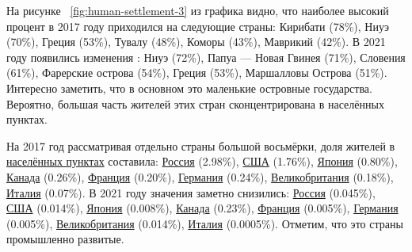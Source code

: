 \begin{figure*}
    \setlength{\fboxsep}{0pt}%
    \setlength{\fboxrule}{1pt}%
	\label{fig:human-settlement-3}
	\caption[Диаграмма доли населения страны. Карелия, 2017.]{Диаграмма доли населения страны, проживающего в "населённых пунктах" (2017). Ссылка на SPARQL-запрос: \href{https://w.wiki/4T4s}{https://w.wiki/4T4s}.}%
\end{figure*} 

\begin{figure*}
    \setlength{\fboxsep}{0pt}%
    \setlength{\fboxrule}{1pt}%
	\label{fig:human-settlement-4}
	\caption[Диаграмма доли населения страны, 2021.]{Диаграмма доли населения страны, проживающего в <<населённых пунктах>> (2021). Ссылка на SPARQL-запрос: \href{https://w.wiki/4T4s}{https://w.wiki/4T4s}}%
\end{figure*} 

На рисунке ~\ref{fig:human-settlement-3} из графика видно, что наиболее высокий процент в 2017 году приходился на следующие страны: Кирибати (78\%), Ниуэ (70\%), Греция (53\%), Тувалу (48\%), Коморы (43\%), Маврикий (42\%). В 2021 году появились изменения : Ниуэ (72\%), Папуа — Новая Гвинея (71\%), Словения (61\%), Фарерские острова (54\%), Греция (53\%), Маршалловы Острова (51\%). Интересно заметить, что в основном это маленькие островные государства. Вероятно, большая часть жителей этих стран сконцентрирована в населённых пунктах.

На 2017 год рассматривая отдельно страны большой восьмёрки, доля жителей в \href{http://www.wikidata.org/entity/Q486972}{населённых пунктах} составила: \href{http://www.wikidata.org/entity/Q159}{Россия} (\num{2.98}\%), \href{http://www.wikidata.org/entity/Q30}{США} (\num{1.76}\%), \href{http://www.wikidata.org/entity/Q17}{Япония} (\num{0.80}\%), \href{http://www.wikidata.org/entity/Q16}{Канада} (\num{0.26}\%), \href{http://www.wikidata.org/entity/Q142}{Франция} (\num{0.20}\%), \href{http://www.wikidata.org/entity/Q183}{Германия} (\num{0.24}\%), \href{http://www.wikidata.org/entity/Q145}{Великобритания} (\num{0.18}\%), \href{http://www.wikidata.org/entity/Q38}{Италия} (\num{0.07}\%). В 2021 году значения заметно снизились: \href{http://www.wikidata.org/entity/Q159}{Россия} (0.045\%), \href{http://www.wikidata.org/entity/Q30}{США} (\num{0.014}\%), \href{http://www.wikidata.org/entity/Q17}{Япония} (\num{0.008}\%), \href{http://www.wikidata.org/entity/Q16}{Канада} (\num{0.23}\%), \href{http://www.wikidata.org/entity/Q142}{Франция} (\num{0.005}\%), \href{http://www.wikidata.org/entity/Q183}{Германия} (\num{0.005}\%), \href{http://www.wikidata.org/entity/Q145}{Великобритания} (\num{0.014}\%), \href{http://www.wikidata.org/entity/Q38}{Италия} (\num{0.0005}\%). Отметим, что это страны промышленно развитые.

